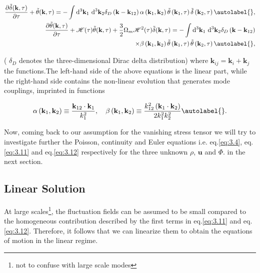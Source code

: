 \begin{align*}
    \frac{\partial \tilde{\delta}(\mathbf{k}, \tau)}{\partial \tau}+\tilde{\theta}(\mathbf{k}, \tau)=-\int \mathrm{d}^{3} \mathbf{k}_{1} \mathrm{~d}^{3} \mathbf{k}_{2} \delta_{D}\left(\mathbf{k}-\mathbf{k}_{12}\right) \alpha\left(\mathbf{k}_{1}, \mathbf{k}_{2}\right) \tilde{\theta}\left(\mathbf{k}_{1}, \tau\right) \tilde{\delta}\left(\mathbf{k}_{2}, \tau\right) \autolabel{}, \\
    \frac{\partial \tilde{\theta}(\mathbf{k}, \tau)}{\partial \tau}+\mathcal{H}(\tau) \tilde{\theta}(\mathbf{k}, \tau)+\frac{3}{2} \Omega_{m} \mathcal{H}^{2}(\tau) \tilde{\delta}(\mathbf{k}, \tau)=-\int \mathrm{d}^{3} \mathbf{k}_{1} \mathrm{~d}^{3} \mathbf{k}_{2} \delta_{D}\left(\mathbf{k}-\mathbf{k}_{12}\right) \\
    \times \beta\left(\mathbf{k}_{1}, \mathbf{k}_{2}\right) \tilde{\theta}\left(\mathbf{k}_{1}, \tau\right) \tilde{\theta}\left(\mathbf{k}_{2}, \tau\right) \autolabel{},
\end{align*}


( $\delta_{D}$ denotes the three-dimensional Dirac delta distribution) where $\mathbf{k}_{ij} = \mathbf{k}_{i} + \mathbf{k}_{j}$ the functions.The left-hand side of the above equations is the linear part, while the right-hand side contains the non-linear evolution that generates mode couplings, imprinted in functions

\begin{equation}
    \alpha\left(\mathbf{k}_{1}, \mathbf{k}_{2}\right) \equiv \frac{\mathbf{k}_{12} \cdot \mathbf{k}_{1}}{k_{1}^{2}}, \quad \beta\left(\mathbf{k}_{1}, \mathbf{k}_{2}\right) \equiv \frac{k_{12}^{2}\left(\mathbf{k}_{1} \cdot \mathbf{k}_{2}\right)}{2 k_{1}^{2} k_{2}^{2}} \autolabel{}.
\end{equation}


Now, coming back to our assumption for the vanishing stress tensor we will try to investigate further the Poisson, continuity and Euler equations i.e. eq.\eqref{eq:3.4}, eq.\eqref{eq:3.11} and eq.\eqref{eq:3.12} respectively for the three unknown $\rho$, $\mathbf{u}$ and $\Phi$. in the next section.

\subsection{Linear Solution}
At large scales\footnote{not to confuse with large scale modes}, the fluctuation fields can be assumed to be small compared to the homogeneous contribution described by the first terms in eq.\eqref{eq:3.11} and eq.\eqref{eq:3.12}. Therefore, it follows that we can linearize them to obtain the equations of motion in the linear regime.


